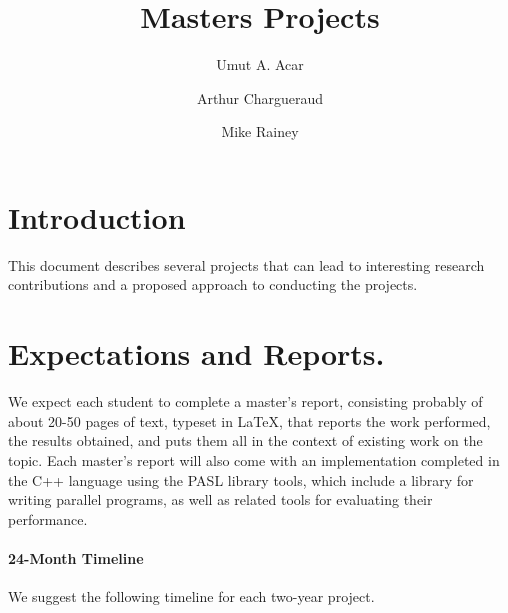 \documentclass[11pt]{article}
\title{Masters Projects}
\author{Umut A. Acar \and Arthur Chargueraud \and Mike Rainey}
\begin{document}
\maketitle

\section{Introduction}

This document describes several projects that can lead to interesting
research contributions and a proposed approach to conducting the
projects.

\section{Expectations and Reports.}

We expect each student to complete a master's report, consisting
probably of about 20-50 pages of text, typeset in LaTeX, that reports
the work performed, the results obtained, and puts them all in the
context of existing work on the topic.  Each master's report will also
come with an implementation completed in the C++ language using the
PASL library tools, which include a library for writing parallel
programs, as well as related tools for evaluating their performance.


\paragraph{24-Month Timeline}
We suggest the following timeline for each two-year project.
\end{document}
